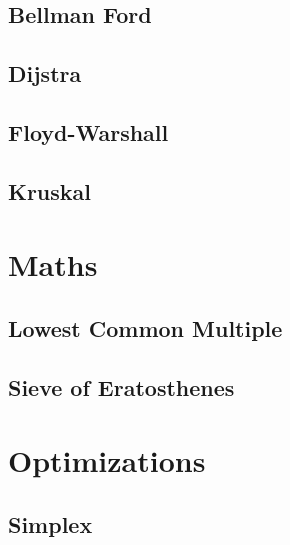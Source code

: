 \documentclass[10pt,a4paper]{article}
\begin{document}
\begin{landscape}
\begin{multicols}{2}


\subsection{Bellman Ford}



\subsection{Dijstra}



\subsection{Floyd-Warshall}



\subsection{Kruskal}



\section{Maths}

\subsection{Lowest Common Multiple}



\subsection{Sieve of Eratosthenes}



\section{Optimizations}

\subsection{Simplex}


\end{multicols}
\end{landscape}
\end{document}
